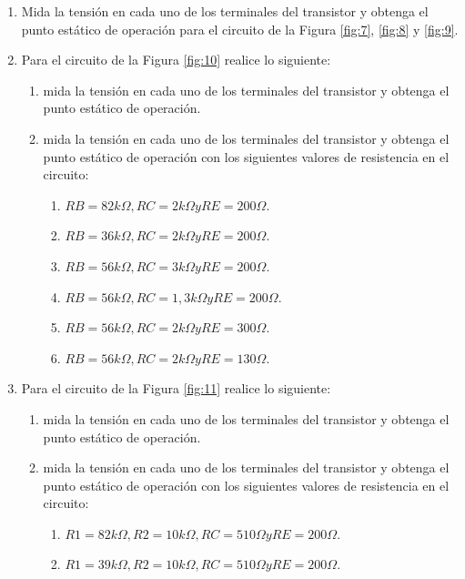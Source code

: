 \documentclass[10pt, a4paper]{article}
\begin{document}
    \begin{enumerate}
        \item Mida la tensión en cada uno de los terminales del transistor y obtenga el punto estático de operación para el circuito de la Figura \ref{fig:7}, \ref{fig:8} y \ref{fig:9}. \label{i1}
        \item Para el circuito de la Figura \ref{fig:10} realice lo siguiente: \label{i2}
        \begin{enumerate}
            \item mida la tensión en cada uno de los terminales del transistor y obtenga el punto estático de operación. \label{pru1}
            \item mida la tensión en cada uno de los terminales del transistor y obtenga el punto estático de operación con los siguientes valores de resistencia en el circuito:
            \begin{enumerate}
                \item $RB=82k\Omega, RC=2k\Omega y RE=200\Omega.$ \label{pru2}
                \item $RB=36k\Omega, RC=2k\Omega y RE=200\Omega.$ \label{pru3}
                \item $RB=56k\Omega, RC=3k\Omega y RE=200\Omega.$ \label{pru4}
                \item $RB=56k\Omega, RC=1,3k\Omega y RE=200\Omega.$ \label{pru5}
                \item $RB=56k\Omega, RC=2k\Omega y RE=300\Omega.$ \label{pru6}
                \item $RB=56k\Omega, RC=2k\Omega y RE=130\Omega.$ \label{pru7}
            \end{enumerate}
        \end{enumerate}
        \item Para el circuito de la Figura \ref{fig:11} realice lo siguiente: \label{i3}
        \begin{enumerate}
            \item mida la tensión en cada uno de los terminales del transistor y obtenga el punto estático de operación. \label{pru8}
            \item mida la tensión en cada uno de los terminales del transistor y obtenga el punto estático de operación con los siguientes valores de resistencia en el circuito:
            \begin{enumerate}
                \item $R1=82k\Omega, R2=10k\Omega, RC=510\Omega y RE=200\Omega.$ \label{pru9}
                \item $R1=39k\Omega, R2=10k\Omega, RC=510\Omega y RE=200\Omega.$ \label{pru10}

\end{enumerate}
\end{enumerate}
\end{enumerate}
\end{document}
